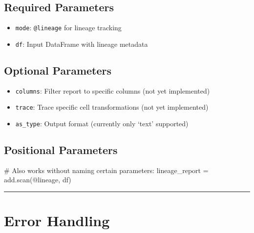 \documentclass[
  letterpaper,
]{scrbook}
\newenvironment{Shaded}{\begin{snugshade}}{\end{snugshade}}
\newcommand{\CommentTok}[1]{\textcolor[rgb]{0.37,0.37,0.37}{#1}}
\newcommand{\NormalTok}[1]{\textcolor[rgb]{0.00,0.23,0.31}{#1}}
\newcommand{\OperatorTok}[1]{\textcolor[rgb]{0.37,0.37,0.37}{#1}}
\newcommand{\StringTok}[1]{\textcolor[rgb]{0.13,0.47,0.30}{#1}}
\providecommand{\tightlist}{%
  \setlength{\itemsep}{0pt}\setlength{\parskip}{0pt}}
\begin{document}
\subsection{Required Parameters}\label{required-parameters-6}

\begin{itemize}
\tightlist
\item
  \texttt{mode}: \texttt{\textquotesingle{}@lineage\textquotesingle{}}
  for lineage tracking
\item
  \texttt{df}: Input DataFrame with lineage metadata
\end{itemize}

\subsection{Optional Parameters}\label{optional-parameters-6}

\begin{itemize}
\tightlist
\item
  \texttt{columns}: Filter report to specific columns (not yet
  implemented)
\item
  \texttt{trace}: Trace specific cell transformations (not yet
  implemented)
\item
  \texttt{as\_type}: Output format (currently only `text' supported)
\end{itemize}

\subsection{Positional Parameters}\label{positional-parameters-7}

\begin{Shaded}
\begin{Highlighting}[]
\CommentTok{\# Also works without naming certain parameters:}
\NormalTok{lineage\_report }\OperatorTok{=}\NormalTok{ add.scan(}\StringTok{\textquotesingle{}@lineage\textquotesingle{}}\NormalTok{, df)}
\end{Highlighting}
\end{Shaded}

\begin{center}\rule{0.5\linewidth}{0.5pt}\end{center}

\section{Error Handling}\label{error-handling}
\end{document}
